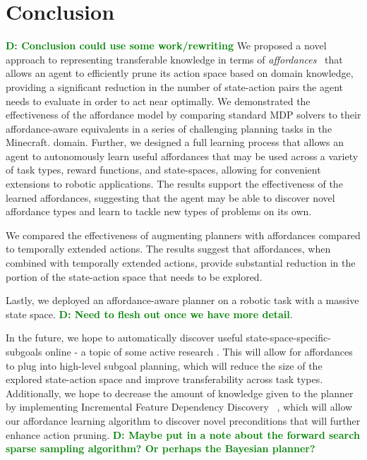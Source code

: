 \documentclass[conference]{IEEEtran}
\newcommand{\dnote}[1]{\textcolor{Green}{\textbf{D: #1}}}
\begin{document}
\section{Conclusion}
\label{sec:conclusion}
\dnote{Conclusion could use some work/rewriting}
We proposed a novel approach to representing transferable knowledge in terms of
{\em affordances}~\cite{gibson77} that allows an agent to efficiently
prune its action space based on domain knowledge,
providing a significant reduction in the number of state-action pairs the
agent needs to evaluate in order to act near optimally. We demonstrated the effectiveness of the affordance model by comparing standard MDP solvers
to their affordance-aware equivalents in a series of challenging planning tasks in the Minecraft.
domain. Further, we designed a full learning process that allows an agent to autonomously learn useful affordances that may be used
across a variety of task types, reward functions, and state-spaces, allowing for convenient extensions to robotic applications.
The results support the effectiveness of the learned affordances, suggesting that the agent may be able to discover novel affordance types and learn to tackle new types of problems on its own.

We compared the effectiveness of augmenting planners with affordances compared to temporally extended actions. The results suggest that affordances, when combined with temporally extended actions, provide substantial reduction in the portion of the state-action space that needs to be explored.

Lastly, we deployed an affordance-aware planner on a robotic task with a massive state space. \dnote{Need to flesh out once we have more detail}.

In the future, we hope to automatically discover useful state-space-specific-subgoals online - a topic of some active research \cite{Mcgovern01automaticdiscovery,Simsek:2005:IUS:1102351.1102454}. This will allow for affordances to plug into high-level subgoal planning, which will reduce the size of the explored state-action space and improve transferability across task types. Additionally, we hope to decrease the amount of knowledge given to the planner by implementing Incremental Feature Dependency Discovery ~\cite{ICML2011Geramifard_473}, which will allow our affordance learning algorithm to discover novel preconditions that will further enhance action pruning. \dnote{Maybe put in a note about the forward search sparse sampling algorithm? Or perhaps the Bayesian planner?}

{\small


}
\end{document}
